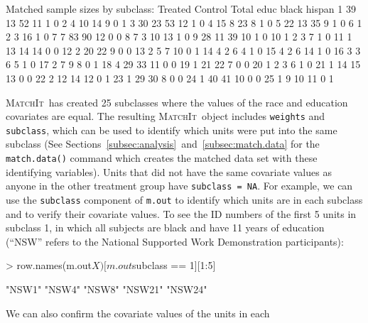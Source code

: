 \documentclass[oneside,letterpaper,titlepage]{article}
\newcommand{\MatchIt}{\textsc{MatchIt}}
\begin{document}
\begin{enumerate}
\begin{Schunk}
\begin{Soutput}
Matched sample sizes by subclass:
   Treated Control Total educ black hispan
1       39      13    52   11     1      0
2        4      10    14    9     0      1
3       30      23    53   12     1      0
4       15       8    23    8     1      0
5       22      13    35    9     1      0
6        1       2     3   16     1      0
7        7      83    90   12     0      0
8        7       3    10   13     1      0
9       28      11    39   10     1      0
10       1       2     3    7     1      0
11       1      13    14   14     0      0
12       2      20    22    9     0      0
13       2       5     7   10     0      1
14       4       2     6    4     1      0
15       4       2     6   14     1      0
16       3       3     6    5     1      0
17       2       7     9    8     0      1
18       4      29    33   11     0      0
19       1      21    22    7     0      0
20       1       2     3    6     1      0
21       1      14    15   13     0      0
22       2      12    14   12     0      1
23       1      29    30    8     0      0
24       1      40    41   10     0      0
25       1       9    10   11     0      1
\end{Soutput}
\end{Schunk}
\MatchIt\ has created 25 subclasses where the values of the race and
education covariates are equal.  The resulting \MatchIt\ object
includes \texttt{weights} and \texttt{subclass}, which can be used to
identify which units were put into the same subclass (See
Sections~\ref{subsec:analysis}~and~\ref{subsec:match.data} for the
{\tt match.data()} command which creates the matched data set with
these identifying variables).  Units that did not have the same
covariate values as anyone in the other treatment group have
\texttt{subclass = NA}.  For example, we can use the {\tt subclass}
component of {\tt m.out} to identify which units are in each subclass
and to verify their covariate values.  To see the ID numbers of the
first 5 units in subclass 1, in which all subjects are black and have
11 years of education (``NSW'' refers to the National Supported Work
Demonstration participants):
\begin{Schunk}
\begin{Sinput}
> row.names(m.out$X)[m.out$subclass == 1][1:5]
\end{Sinput}
\begin{Soutput}
[1] "NSW1"  "NSW4"  "NSW8"  "NSW21" "NSW24"
\end{Soutput}
\end{Schunk}
We can also confirm the covariate values of the units in each

\end{enumerate}
\end{document}
